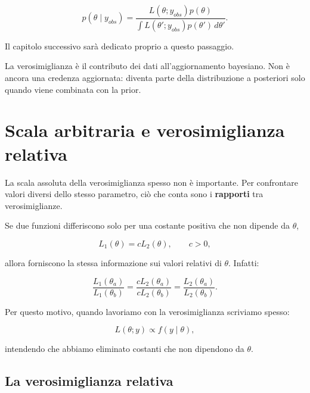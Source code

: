 \documentclass[
  italian,
  letterpaper,
  a4paper,
  11pt,
  open=any]{scrbook}
\theoremstyle{plain}
\theoremstyle{definition}
\theoremstyle{definition}
\theoremstyle{remark}
\begin{document}
\[
p(\theta \mid y_{obs})
= \frac{L(\theta; y_{obs})p(\theta)}{\int L(\theta'; y_{obs})p(\theta')\,d\theta'}.
\]

Il capitolo successivo sarà dedicato proprio a questo passaggio.

\begin{tcolorbox}[enhanced jigsaw, arc=.35mm, bottomrule=.15mm, bottomtitle=1mm, breakable, colback=white, colbacktitle=quarto-callout-important-color!10!white, colframe=quarto-callout-important-color-frame, coltitle=black, left=2mm, leftrule=.75mm, opacityback=0, opacitybacktitle=0.6, rightrule=.15mm, title=\textcolor{quarto-callout-important-color}{\faExclamation}\hspace{0.5em}{Da ricordare}, titlerule=0mm, toprule=.15mm, toptitle=1mm]

La verosimiglianza è il contributo dei dati all'aggiornamento bayesiano.
Non è ancora una credenza aggiornata: diventa parte della distribuzione
a posteriori solo quando viene combinata con la prior.

\end{tcolorbox}

\section{Scala arbitraria e verosimiglianza
relativa}\label{sec-relative-likelihood}

La scala assoluta della verosimiglianza spesso non è importante. Per
confrontare valori diversi dello stesso parametro, ciò che conta sono i
\textbf{rapporti} tra verosimiglianze.

Se due funzioni differiscono solo per una costante positiva che non
dipende da \(\theta\),

\[
L_1(\theta) = c L_2(\theta), \qquad c > 0,
\]

allora forniscono la stessa informazione sui valori relativi di
\(\theta\). Infatti:

\[
\frac{L_1(\theta_a)}{L_1(\theta_b)}
= \frac{cL_2(\theta_a)}{cL_2(\theta_b)}
= \frac{L_2(\theta_a)}{L_2(\theta_b)}.
\]

Per questo motivo, quando lavoriamo con la verosimiglianza scriviamo
spesso:

\[
L(\theta; y) \propto f(y \mid \theta),
\]

intendendo che abbiamo eliminato costanti che non dipendono da
\(\theta\).

\subsection{La verosimiglianza
relativa}\label{la-verosimiglianza-relativa}
\end{document}

